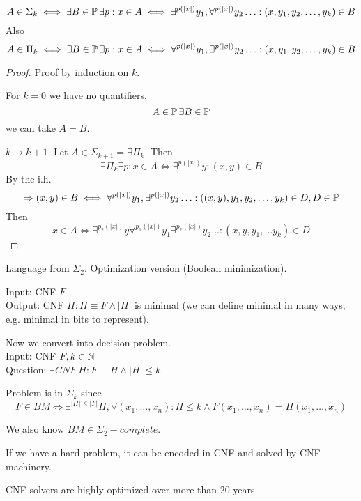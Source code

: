 \begin{definition}\label{ph_altern}
	\[ A \in \Sigma_k \iff \exists B \in \operatorname{\mathbb{P}} \exists p: x \in A \iff \exists^{p(|x|)} y_1, \forall^{p(|x|)} y_2 \ldots : (x, y_1, y_2, \ldots, y_k) \in B \]
	Also
	\[ A \in \Pi_k \iff \exists B \in \operatorname{\mathbb{P}} \exists p: x \in A \iff \forall^{p(|x|)} y_1, \exists^{p(|x|)} y_2 \ldots : (x, y_1, y_2, \ldots, y_k) \in B \]
\end{definition}
\begin{proof}
	Proof by induction on $k$.

	For $k = 0$ we have no quantifiers.
	\[ A \in \operatorname{\mathbb{P}} \exists B \in \operatorname{\mathbb{P}} \]
	we can take $A = B$.

	$k \to k + 1$. Let $A \in \Sigma_{k + 1} = \exists \Pi_k$.
	Then
	\[ \exists \Pi_k \exists p: x \in A \iff \exists^{p(|x|)} y: (x,y) \in B \]
	By the i.h.
	\[ \Rightarrow (x,y) \in B \iff \forall^{p(|x|)} y_1, \exists^{p(|x|)} y_2 \ldots : ((x,y), y_1, y_2, \ldots, y_k) \in D, D \in \operatorname{\mathbb{P}} \]
	Then
	\[ x \in A \iff \exists^{p_2(|x|)} y \forall^{p_1(|x|)} y_1 \exists^{p_2(|x|)} y_2 \ldots :(x, y, y_1, \ldots y_k) \in D \]
\end{proof}

\begin{example}
	Language from $\Sigma_2$.
	Optimization version (Boolean minimization).

	Input: CNF $F$\\
	Output: CNF $H: H \equiv F \land |H|$ is minimal (we can define minimal in many ways, e.g. minimal in bits to represent).

	Now we convert into decision problem.\\
	Input: CNF $F, k \in \operatorname{\mathbb{N}}$ \\
	Question: $\exists CNF\ H: F \equiv H \land |H| \leq k $.

	Problem is in $\Sigma_k$ since
	\[ F \in BM \iff \exists^{|H| \leq |F|} H, \forall (x_1, \ldots, x_n): H \leq k \land F(x_1, \ldots, x_n) = H(x_1, \ldots, x_n) \]

	We also know $BM \in \Sigma_2-complete$.
\end{example}

\begin{note}
	If we have a hard problem, it can be encoded in CNF and solved by CNF machinery.

	CNF solvers are highly optimized over more than 20 years.
\end{note}
